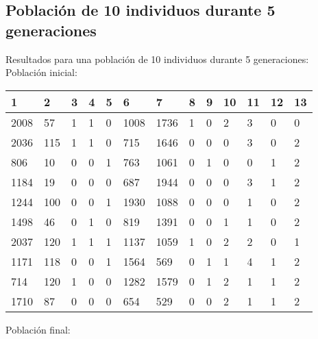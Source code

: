 \subsection{Población de 10 individuos durante 5 generaciones}
Resultados para una población de 10 individuos durante 5 generaciones:
Población inicial:
\begin{table}[H]
\begin{tabular}{|l|l|l|l|l|l|l|l|l|l|l|l|l|}
\hline
\textbf{1} & \textbf{2} & \textbf{3} & \textbf{4} & \textbf{5} & \textbf{6} & \textbf{7} & \textbf{8} & \textbf{9} & \textbf{10} & \textbf{11} & \textbf{12} & \textbf{13} \\ \hline
2008  &  57  &  1  &  1  &  0  &  1008  &  1736  &  1  &  0  &  2  &  3  &  0  &  0 \\ \hline
2036  &  115  &  1  &  1  &  0  &  715  &  1646  &  0  &  0  &  0  &  3  &  0  &  2 \\ \hline
806  &  10  &  0  &  0  &  1  &  763  &  1061  &  0  &  1  &  0  &  0  &  1  &  2 \\ \hline
1184  &  19  &  0  &  0  &  0  &  687  &  1944  &  0  &  0  &  0  &  3  &  1  &  2 \\ \hline
1244  &  100  &  0  &  0  &  1  &  1930  &  1088  &  0  &  0  &  0  &  1  &  0  &  2 \\ \hline
1498  &  46  &  0  &  1  &  0  &  819  &  1391  &  0  &  0  &  1  &  1  &  0  &  2 \\ \hline
2037  &  120  &  1  &  1  &  1  &  1137  &  1059  &  1  &  0  &  2  &  2  &  0  &  1 \\ \hline
1171  &  118  &  0  &  0  &  1  &  1564  &  569  &  0  &  1  &  1  &  {\color[HTML]{FE0000}4}  &  1  &  2 \\ \hline
714  &  120  &  1  &  0  &  0  &  1282  &  1579  &  0  &  1  &  2  &  1  &  1  &  2 \\ \hline
1710  &  87  &  0  &  0  &  0  &  654  &  529  &  0  &  0  &  2  &  1  &  1  &  2 \\ \hline
\end{tabular}
\end{table}
Población final:
